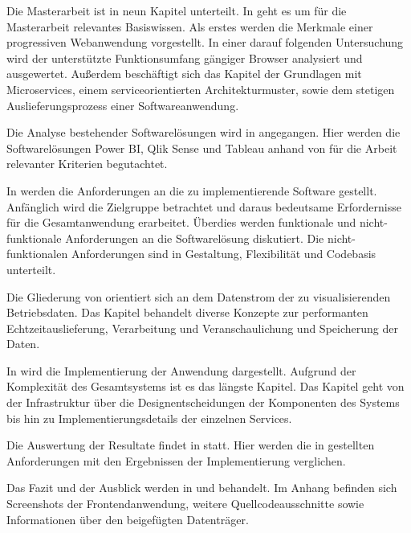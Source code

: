 Die Masterarbeit ist in neun Kapitel unterteilt. In  geht es um für
die Masterarbeit relevantes Basiswissen. Als erstes werden die Merkmale einer progressiven
Webanwendung vorgestellt. In einer darauf folgenden Untersuchung wird der
unterstützte Funktionsumfang gängiger Browser analysiert und ausgewertet.
Außerdem beschäftigt sich das Kapitel der Grundlagen mit Microservices, einem serviceorientierten
Architekturmuster, sowie dem stetigen Auslieferungsprozess einer Softwareanwendung.

Die Analyse bestehender Softwarelösungen wird in 
angegangen. Hier werden die Softwarelösungen Power BI, Qlik Sense und Tableau anhand von für
die Arbeit relevanter Kriterien begutachtet.

In  werden die Anforderungen an die zu implementierende Software
gestellt. Anfänglich wird die Zielgruppe betrachtet und daraus bedeutsame Erfordernisse
für die Gesamtanwendung erarbeitet. Überdies werden funktionale und nicht-funktionale Anforderungen
an die Softwarelösung diskutiert. Die nicht-funktionalen Anforderungen sind in 
Gestaltung, Flexibilität und Codebasis unterteilt.

Die Gliederung von  orientiert sich an dem Datenstrom der zu visualisierenden
Betriebsdaten. Das Kapitel behandelt diverse Konzepte zur performanten Echtzeitauslieferung, Verarbeitung
und Veranschaulichung und Speicherung der Daten.

In  wird die Implementierung der Anwendung dargestellt. Aufgrund der Komplexität
des Gesamtsystems ist es das längste Kapitel. Das Kapitel geht von der Infrastruktur über die Designentscheidungen
der Komponenten des Systems bis hin zu Implementierungsdetails der einzelnen Services.

Die Auswertung der Resultate findet in  statt. Hier werden die in 
gestellten Anforderungen mit den Ergebnissen der Implementierung verglichen.

Das Fazit und der Ausblick werden in  und  behandelt. Im Anhang befinden
sich Screenshots der Frontendanwendung, weitere Quellcodeausschnitte sowie Informationen
über den beigefügten Datenträger.
